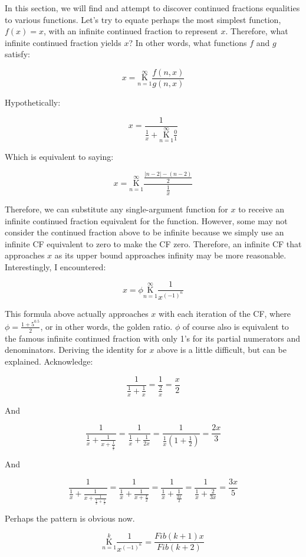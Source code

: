\documentclass{article}
\begin{document}
In this section, we will find and attempt to discover continued fractions equalities to various functions. Let’s try to equate perhaps the most simplest function, $f(x)=x$, with an infinite continued fraction to represent $x$. Therefore, what infinite continued fraction yields $x$? In other words, what functions $f$ and $g$ satisfy:

$$x=\underset{n=1}{\overset{\infty}{\mathrm K}} \frac{f(n,x)}{g(n,x)}$$

Hypothetically:

$$x=\frac{1}{\frac{1}{x}+\underset{n=1}{\overset{\infty}{\mathrm K}} \frac{0}{1}}$$

Which is equivalent to saying:

$$x=\underset{n=1}{\overset{\infty}{\mathrm K}} \frac{\frac{|n-2|-(n-2)}{2}}{\frac{1}{x}}$$

Therefore, we can substitute any single-argument function for $x$ to receive an infinite continued fraction equivalent for the function. However, some may not consider the continued fraction above to be infinite because we simply use an infinite CF equivalent to zero to make the CF zero. Therefore, an infinite CF that approaches $x$ as its upper bound approaches infinity may be more reasonable. Interestingly, I encountered:

$$x=\phi \underset{n=1}{\overset{\infty}{\mathrm K}} \frac{1}{x^{(-1)^{n}}}$$

This formula above actually approaches $x$ with each iteration of the CF, where $\phi=\frac{1+5^{0.5}}{2}$, or in other words, the golden ratio. $\phi$ of course also is equivalent to the famous infinite continued fraction with only 1’s for its partial numerators and denominators. Deriving the identity for $x$ above is a little difficult, but can be explained. Acknowledge:

$$\frac{1}{\frac{1}{x}+\frac{1}{x}}=\frac{1}{\frac{2}{x}}=\frac{x}{2}$$

And

$$\frac{1}{\frac{1}{x}+\frac{1}{x+\frac{1}{\frac{1}{x}}}}=\frac{1}{\frac{1}{x}+\frac{1}{2x}}=\frac{1}{\frac{1}{x}(1+\frac{1}{2})}=\frac{2x}{3}$$

And

$$\frac{1}{\frac{1}{x}+\frac{1}{x+\frac{1}{\frac{1}{x}+\frac{1}{x}}}}=\frac{1}{\frac{1}{x}+\frac{1}{x+\frac{x}{2}}}=\frac{1}{\frac{1}{x}+\frac{1}{\frac{3x}{2}}}=\frac{1}{\frac{1}{x}+\frac{2}{3x}}=\frac{3x}{5}$$

Perhaps the pattern is obvious now.

$$\underset{n=1}{\overset{k}{\mathrm K}} \frac{1}{x^{(-1)^{n}}}=\frac{Fib(k+1)x}{Fib(k+2)}$$
\end{document}
